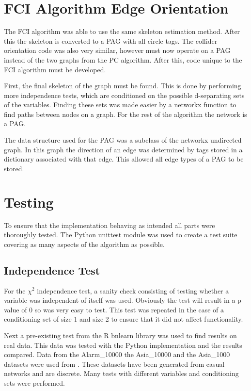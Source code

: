 \documentclass{UoYCSproject}
\begin{document}
\section{FCI Algorithm Edge Orientation}

The FCI algorithm was able to use the same skeleton estimation method. After this the skeleton is converted to a PAG with all circle tags. The collider orientation code was also very similar, however must now operate on a PAG instead of the two graphs from the PC algorithm. After this, code unique to the FCI algorithm must be developed.

First, the final skeleton of the graph must be found. This is done by performing more independence tests, which are conditioned on the possible d-separating sets of the variables. Finding these sets was made easier by a networkx function to find paths between nodes on a graph. For the rest of the algorithm the network is a PAG. 

The data structure used for the PAG was a subclass of the networkx undirected graph. In this graph the direction of an edge was determined by tags stored in a dictionary associated with that edge. This allowed all edge types of a PAG to be stored.

\section{Testing}

To ensure that the implementation behaving as intended all parts were thoroughly tested. The Python unittest module was used to create a test suite covering as many aspects of the algorithm as possible.

\subsection{Independence Test}
For the $\chi^2$ independence test, a sanity check consisting of testing whether a variable was independent of itself was used. Obviously the test will result in a p-value of 0 so was very easy to test. This test was repeated in the case of a conditioning set of size 1 and size 2 to ensure that it did not affect functionality.

Next a pre-existing test from the R bnlearn library was used to find results on real data. This data was tested with the Python implementation and the results compared. Data from the Alarm\_10000 the Asia\_10000 and the Asia\_1000 datasets were used from \parencite{data}. These datasets have been generated from casual networks and are discrete. Many tests with different variables and conditioning sets were performed.
\end{document}

